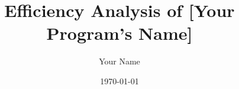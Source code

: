\documentclass[a4paper,12pt]{report}
\begin{document}
\title{Efficiency Analysis of [Your Program's Name]}
\author{Your Name}
\date{\today}
\maketitle
\end{document}
